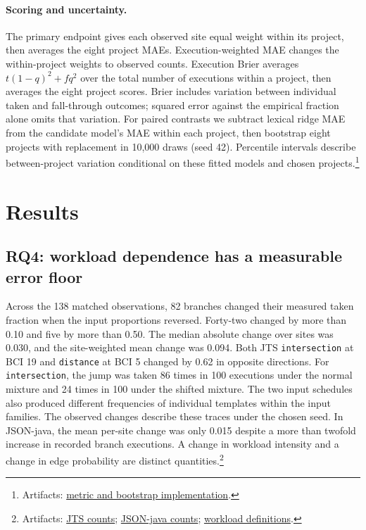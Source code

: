 \documentclass[11pt]{article}
\newcommand{\repocommit}{81d03caebe268d013b3163bcbff31cadabaaec21}
\newcommand{\repourl}{https://github.com/minggu151623/llm_profiling_research}
\newcommand{\repo}[2]{\href{\repourl/blob/\repocommit/#1}{#2}}
\newcommand{\artifacts}[1]{\footnote{Artifacts: #1.}}
\begin{document}
\paragraph{Scoring and uncertainty.} The primary endpoint gives each observed site equal weight within its project, then averages the eight project MAEs. Execution-weighted MAE changes the within-project weights to observed counts. Execution Brier averages $t(1-q)^2+fq^2$ over the total number of executions within a project, then averages the eight project scores. Brier includes variation between individual taken and fall-through outcomes; squared error against the empirical fraction alone omits that variation. For paired contrasts we subtract lexical ridge MAE from the candidate model's MAE within each project, then bootstrap eight projects with replacement in 10,000 draws (seed 42). Percentile intervals describe between-project variation conditional on these fitted models and chosen projects.\artifacts{\repo{ml/summarize.py}{metric and bootstrap implementation}}

\section{Results}

\subsection{RQ4: workload dependence has a measurable error floor}

Across the 138 matched observations, 82 branches changed their measured taken fraction when the input proportions reversed. Forty-two changed by more than 0.10 and five by more than 0.50. The median absolute change over sites was 0.030, and the site-weighted mean change was 0.094. Both JTS \texttt{intersection} at BCI 19 and \texttt{distance} at BCI 5 changed by 0.62 in opposite directions. For \texttt{intersection}, the jump was taken 86 times in 100 executions under the normal mixture and 24 times in 100 under the shifted mixture. The two input schedules also produced different frequencies of individual templates within the input families. The observed changes describe these traces under the chosen seed. In JSON-java, the mean per-site change was only 0.015 despite a more than twofold increase in recorded branch executions. A change in workload intensity and a change in edge probability are distinct quantities.\artifacts{\repo{experiments/study/corpus/jts}{JTS counts}; \repo{experiments/study/corpus/org-json}{JSON-java counts}; \repo{experiments/configs/corpus.json}{workload definitions}}
\end{document}
